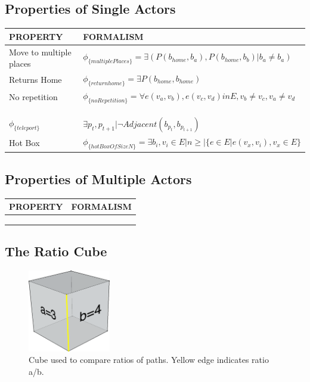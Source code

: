\subsection{Properties of Single Actors}


\begin{tabular}{| p{2.8cm} | p{11.5cm} | }
\hline
PROPERTY & FORMALISM \\ \hline
Move to multiple places & $\phi_{\{multiplePlaces\}} = \exists (P(b_{home}, b_a), P(b_{home}, b_b)| b_a \neq b_a)$ \\ \hline
Returns Home & $\phi_{\{returnhome\}} = \exists P(b_{home}, b_{home})$ \\ \hline
No repetition & $\phi_{\{noRepetition\}} = \forall e(v_a, v_b), e(v_c,v_d) in E, v_b \neq v_c, v_a \neq v_d$ \\ \hline
 & \\ \hline
 & \\ \hline
 & \\ \hline
$\phi_{\{teleport\}}$ & $  \exists  p_t, p_{t+1} | \lnot Adjacent(b_{p_t}, b_{p_{t+1}})$ \\ \hline
Hot Box & $\phi_{\{hotBoxOfSizeN\}} = \exists b_i, v_i \in E | n \geq |\{e \in E | e(v_x, v_i), v_x \in E\}$ \\ \hline
\end{tabular}


\subsection{Properties of Multiple Actors}
\begin{tabular}{| p{2.8cm} | p{11.5cm} | }
\hline
PROPERTY & FORMALISM \\ \hline
 & \\ \hline
 & \\ \hline
 & \\ \hline
\end{tabular}

\subsection{The Ratio Cube}

\begin{figure}
  \centering
  \includegraphics[width=0.32\textwidth]{./figures/counting_cube.png}
  \caption{Cube used to compare ratios of paths.  Yellow edge indicates ratio a/b.}
  \label{fig:unitCubes}
\end{figure}


